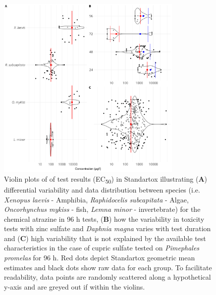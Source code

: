 \documentclass[journal,datadescriptor,submit,moreauthors,pdftex]{Definitions/mdpi}
\begin{document}
\begin{figure}[H]
    \centering
    \includegraphics[width=0.8\textwidth]{article/figures/results_variability.png}
    \caption{Violin plots of of test results (EC\textsubscript{50}) in Standartox illustrating (\textbf{A}) differential variability and data distribution between species (i.e. \textit{Xenopus laevis} - Amphibia, \textit{Raphidocelis subcapitata} - Algae, \textit{Oncorhynchus mykiss} - fish, \textit{Lemna minor} - invertebrate) for the chemical atrazine in 96 h tests, (\textbf{B}) how the variability in toxicity tests with zinc sulfate and \textit{Daphnia magna} varies with test duration and (\textbf{C}) high variability that is not explained by the available test characteristics in the case of cupric sulfate tested on \textit{Pimephales promelas} for 96 h. Red dots depict Standartox geometric mean estimates and black dots show raw data for each group. To facilitate readability, data points are randomly scattered along a hypothetical y-axis and are greyed out if within the violins.}
    \label{fig:stx-variability}
\end{figure}
\end{document}
